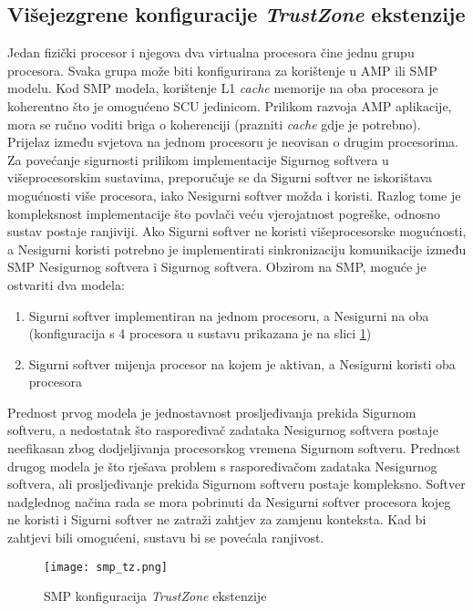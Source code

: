\documentclass[times, utf8, diplomski, numeric]{fer}
\begin{document}
\subsection{Višejezgrene konfiguracije \textit{TrustZone} ekstenzije}
Jedan fizički procesor i njegova dva virtualna procesora čine jednu grupu procesora. Svaka grupa može biti konfigurirana za
korištenje u AMP ili SMP modelu. Kod SMP modela, korištenje L1 \textit{cache} memorije na oba procesora je koherentno što
je omogućeno SCU jedinicom. Prilikom razvoja AMP aplikacije, mora se ručno voditi briga o koherenciji (prazniti \textit{cache}
gdje je potrebno). Prijelaz između svjetova na jednom procesoru je neovisan o drugim procesorima. Za povećanje sigurnosti
prilikom implementacije Sigurnog softvera u višeprocesorskim sustavima, preporučuje se da Sigurni softver ne iskorištava
mogućnosti više procesora, iako Nesigurni softver možda i koristi. Razlog tome je kompleksnost implementacije što povlači
veću vjerojatnost pogreške, odnosno sustav postaje ranjiviji. Ako Sigurni softver ne koristi višeprocesorske mogućnosti,
a Nesigurni koristi potrebno je implementirati sinkronizaciju komunikacije između SMP Nesigurnog softvera i Sigurnog softvera.
Obzirom na SMP, moguće je ostvariti dva modela:
\begin{enumerate}
  \item{Sigurni softver implementiran na jednom procesoru, a Nesigurni na oba (konfiguracija s 4 procesora u sustavu prikazana
  je na slici \ref{smp_tz})}
  \item{Sigurni softver mijenja procesor na kojem je aktivan, a Nesigurni koristi oba procesora}
\end{enumerate}
Prednost prvog modela je jednostavnost prosljeđivanja prekida Sigurnom softveru, a nedostatak što raspoređivač zadataka
Nesigurnog softvera postaje neefikasan zbog dodjeljivanja procesorskog vremena Sigurnom softveru. Prednost drugog modela je
što rješava problem s raspoređivačom zadataka Nesigurnog softvera, ali prosljeđivanje prekida Sigurnom softveru postaje
kompleksno. Softver nadglednog načina rada se mora pobrinuti da Nesigurni softver procesora kojeg ne koristi i Sigurni softver
ne zatraži zahtjev za zamjenu konteksta. Kad bi zahtjevi bili omogućeni, sustavu bi se povećala ranjivost.
\begin{figure}[H]
  \centering
	\texttt{[image: smp\_tz.png]}%
	\caption{SMP konfiguracija \textit{TrustZone} ekstenzije \cite{tz_wp}}
	\label{smp_tz}%
\end{figure}
\end{document}

